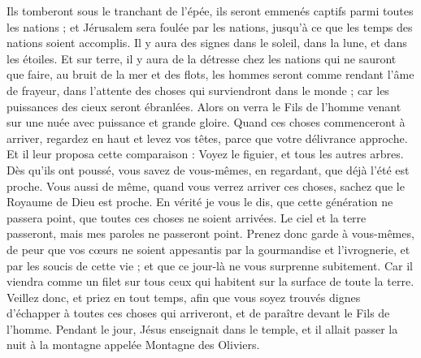 \begin{multicols}{2}
Ils tomberont sous le tranchant de l'épée, ils seront emmenés captifs parmi toutes les nations ; et Jérusalem sera foulée par les nations, jusqu'à ce que les temps des nations soient accomplis.
Il y aura des signes dans le soleil, dans la lune, et dans les étoiles. Et sur terre, il y aura de la détresse chez les nations qui ne sauront que faire, au bruit de la mer et des flots,
les hommes seront comme rendant l'âme de frayeur, dans l'attente des choses qui surviendront dans le monde ; car les puissances des cieux seront ébranlées.
Alors on verra le Fils de l'homme venant sur une nuée avec puissance et grande gloire.
Quand ces choses commenceront à arriver, regardez en haut et levez vos têtes, parce que votre délivrance approche.
Et il leur proposa cette comparaison : Voyez le figuier, et tous les autres arbres.
Dès qu’ils ont poussé, vous savez de vous-mêmes, en regardant, que déjà l’été est proche.
Vous aussi de même, quand vous verrez arriver ces choses, sachez que le Royaume de Dieu est proche.
En vérité je vous le dis, que cette génération ne passera point, que toutes ces choses ne soient arrivées.
Le ciel et la terre passeront, mais mes paroles ne passeront point.
Prenez donc garde à vous-mêmes, de peur que vos cœurs ne soient appesantis par la gourmandise et l'ivrognerie, et par les soucis de cette vie ; et que ce jour-là ne vous surprenne subitement.
Car il viendra comme un filet sur tous ceux qui habitent sur la surface de toute la terre.
Veillez donc, et priez en tout temps, afin que vous soyez trouvés dignes d’échapper à toutes ces choses qui arriveront, et de paraître devant le Fils de l'homme.
Pendant le jour, Jésus enseignait dans le temple, et il allait passer la nuit à la montagne appelée Montagne des Oliviers.

\end{multicols}
